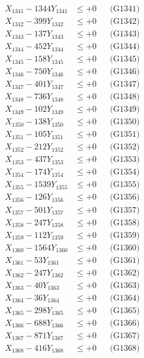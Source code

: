 \documentclass[a4paper,10pt]{article}
\begin{document}
{\begin{align}
\allowbreak
X_{1341} - 1344Y_{1341} &\leq +0 && \text{(G1341)} \\
X_{1342} - 399Y_{1342} &\leq +0 && \text{(G1342)} \\
X_{1343} - 137Y_{1343} &\leq +0 && \text{(G1343)} \\
X_{1344} - 452Y_{1344} &\leq +0 && \text{(G1344)} \\
X_{1345} - 158Y_{1345} &\leq +0 && \text{(G1345)} \\
X_{1346} - 750Y_{1346} &\leq +0 && \text{(G1346)} \\
X_{1347} - 401Y_{1347} &\leq +0 && \text{(G1347)} \\
X_{1348} - 736Y_{1348} &\leq +0 && \text{(G1348)} \\
X_{1349} - 102Y_{1349} &\leq +0 && \text{(G1349)} \\
X_{1350} - 138Y_{1350} &\leq +0 && \text{(G1350)} \\
\allowbreak
X_{1351} - 105Y_{1351} &\leq +0 && \text{(G1351)} \\
X_{1352} - 212Y_{1352} &\leq +0 && \text{(G1352)} \\
X_{1353} - 437Y_{1353} &\leq +0 && \text{(G1353)} \\
X_{1354} - 174Y_{1354} &\leq +0 && \text{(G1354)} \\
X_{1355} - 1539Y_{1355} &\leq +0 && \text{(G1355)} \\
X_{1356} - 126Y_{1356} &\leq +0 && \text{(G1356)} \\
X_{1357} - 501Y_{1357} &\leq +0 && \text{(G1357)} \\
X_{1358} - 247Y_{1358} &\leq +0 && \text{(G1358)} \\
X_{1359} - 112Y_{1359} &\leq +0 && \text{(G1359)} \\
X_{1360} - 1564Y_{1360} &\leq +0 && \text{(G1360)} \\
\allowbreak
X_{1361} - 53Y_{1361} &\leq +0 && \text{(G1361)} \\
X_{1362} - 247Y_{1362} &\leq +0 && \text{(G1362)} \\
X_{1363} - 40Y_{1363} &\leq +0 && \text{(G1363)} \\
X_{1364} - 36Y_{1364} &\leq +0 && \text{(G1364)} \\
X_{1365} - 298Y_{1365} &\leq +0 && \text{(G1365)} \\
X_{1366} - 688Y_{1366} &\leq +0 && \text{(G1366)} \\
X_{1367} - 871Y_{1367} &\leq +0 && \text{(G1367)} \\
X_{1368} - 416Y_{1368} &\leq +0 && \text{(G1368)} \\

\end{align}}
\end{document}
